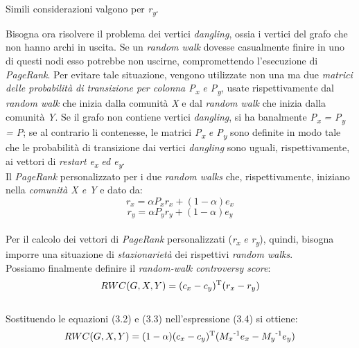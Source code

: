 \begin{enumerate}
\begin{itemize}
\\Simili considerazioni valgono per \textit{r\textsubscript{y}}.
\end{itemize}
Bisogna ora risolvere il problema dei vertici \textit{dangling}, ossia i vertici del grafo che non hanno archi in uscita. Se un \textit{random walk} dovesse casualmente finire in uno di questi nodi esso potrebbe non uscirne, compromettendo l'esecuzione di \textit{PageRank}. Per evitare tale situazione, vengono utilizzate non una ma due \textit{matrici delle probabilità di transizione per colonna P\textsubscript{x} e P\textsubscript{y}}, usate rispettivamente dal \textit{random walk} che inizia dalla comunità \textit{X} e dal \textit{random walk} che inizia dalla comunità \textit{Y}. Se il grafo non contiene vertici \textit{dangling}, si ha banalmente \textit{P\textsubscript{x} = P\textsubscript{y} = P}; se al contrario li contenesse, le matrici \textit{P\textsubscript{x} e P\textsubscript{y}} sono definite in modo tale che le probabilità di transizione dai vertici \textit{dangling} sono uguali, rispettivamente, ai vettori di \textit{restart} \textit{e\textsubscript{x} ed e\textsubscript{y}}.
\\Il \textit{PageRank} personalizzato per i due \textit{random walks} che, rispettivamente, iniziano nella \textit{comunità X e Y} e dato da:
\\
\begin{equation}
r_x = \alpha P_xr_x + (1-\alpha)e_x
\end{equation}
\begin{equation}
r_y = \alpha P_yr_y + (1-\alpha)e_y
\end{equation}
\\
Per il calcolo dei vettori di \textit{PageRank} personalizzati (\textit{r\textsubscript{x} e r\textsubscript{y}}), quindi, bisogna imporre una situazione di \textit{stazionarietà} dei rispettivi \textit{random walks}. 
\\Possiamo finalmente definire il \textit{random-walk controversy score}:
\\
\begin{equation}
RWC(G,X,Y) = (c_x - c_y)\textsuperscript{T}(r_x - r_y)
\end{equation}
\\
Sostituendo le equazioni (3.2) e (3.3) nell'espressione (3.4) si ottiene:
\\
\begin{equation}
RWC(G,X,Y) = (1 - \alpha)(c_x - c_y)\textsuperscript{T}(M_x\textsuperscript{-1}e_x - M_y\textsuperscript{-1}e_y)

\end{equation}
\end{enumerate}
